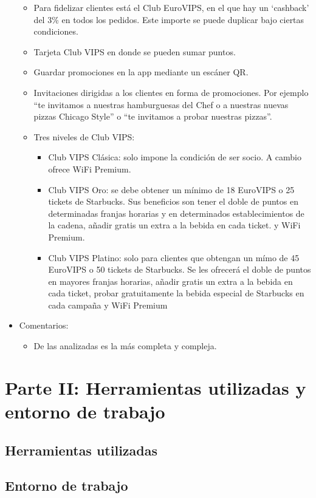\documentclass[twoside]{report}
\begin{document}
\begin{itemize}
	\begin{itemize}
	\item Para fidelizar clientes está el Club EuroVIPS, en el que hay un ‘cashback’ del 3\% en todos los pedidos. Este importe se puede duplicar bajo ciertas condiciones.
	\item Tarjeta Club VIPS en donde se pueden sumar puntos.
	\item Guardar promociones en la app mediante un escáner QR.
	\item Invitaciones dirigidas a los clientes en forma de promociones. Por ejemplo “te invitamos a nuestras hamburguesas del Chef o a nuestras nuevas pizzas Chicago Style” o “te invitamos a probar nuestras pizzas”.
	\item Tres niveles de Club VIPS: 
		\begin{itemize}
		\item Club VIPS Clásica: solo impone la condición de ser socio. A cambio ofrece WiFi Premium.
		\item Club VIPS Oro: se debe obtener un mínimo de 18 EuroVIPS o 25 tickets de Starbucks. Sus beneficios son tener el doble de puntos en determinadas franjas horarias y en determinados establecimientos de la cadena, añadir gratis un extra a la bebida en cada ticket. y WiFi Premium.
		\item Club VIPS Platino: solo para clientes que obtengan un mímo de 45 EuroVIPS o 50 tickets de Starbucks. Se les ofrecerá el doble de puntos en mayores franjas horarias, añadir gratis un extra a la bebida en cada ticket, probar gratuitamente la bebida especial de Starbucks en cada campaña y WiFi Premium
		\end{itemize}
	\end{itemize}
\item Comentarios: 
	\begin{itemize}
	\item De las analizadas es la más completa y compleja.
	\end{itemize}
\end{itemize}

\chapter{Parte II: Herramientas utilizadas y entorno de trabajo}
\section{Herramientas utilizadas}
\section{Entorno de trabajo}
\end{document}
